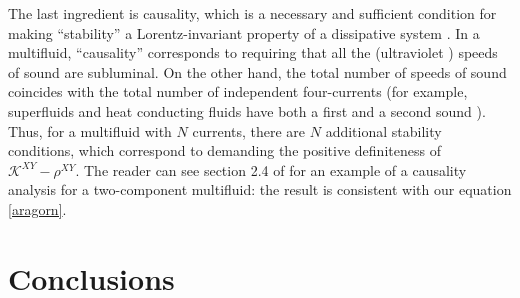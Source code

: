 \documentclass[a4paper, amsfonts, amssymb, amsmath, reprint, showkeys, nofootinbib, twoside, onecolumn,notitlepage]{revtex4-1}
\theoremstyle{definition}
\theoremstyle{theorem}
\begin{document}
The last ingredient is causality, which is a necessary and sufficient condition for making ``stability'' a Lorentz-invariant property of a dissipative system \cite{GavassinoSuperluminal2021}. In a multifluid, ``causality'' corresponds to requiring that all the (ultraviolet \cite{CamelioGavassino2022}) speeds of sound are subluminal. On the other hand, the total number of speeds of sound coincides with the total number of independent four-currents (for example, superfluids and heat conducting fluids have both a first and a second sound \cite{rezzolla_book,cool1995,Lopez11}). Thus, for a multifluid with $N$ currents, there are $N$ additional stability conditions, which correspond to demanding the positive definiteness of $\mathcal{K}^{XY}-\rho^{XY}$. The reader can see section 2.4 of \citet{noto_rel} for an example of a causality analysis for a two-component multifluid: the result is consistent with our equation \eqref{aragorn}.

 

\section{Conclusions}
\end{document}
